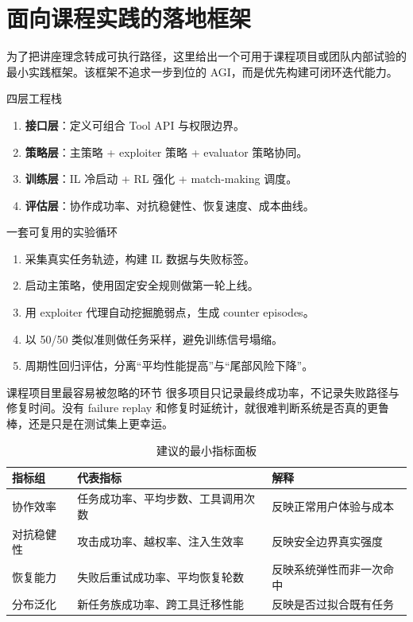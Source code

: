 \documentclass[a4paper]{article}
\begin{document}
\section{面向课程实践的落地框架}

为了把讲座理念转成可执行路径，这里给出一个可用于课程项目或团队内部试验的最小实践框架。该框架不追求一步到位的 AGI，而是优先构建可闭环迭代能力。

\begin{importantbox}{四层工程栈}
\begin{enumerate}
    \item \textbf{接口层}：定义可组合 Tool API 与权限边界。
    \item \textbf{策略层}：主策略 + exploiter 策略 + evaluator 策略协同。
    \item \textbf{训练层}：IL 冷启动 + RL 强化 + match-making 调度。
    \item \textbf{评估层}：协作成功率、对抗稳健性、恢复速度、成本曲线。
\end{enumerate}
\end{importantbox}

\begin{knowledgebox}{一套可复用的实验循环}
\begin{enumerate}
    \item 采集真实任务轨迹，构建 IL 数据与失败标签。
    \item 启动主策略，使用固定安全规则做第一轮上线。
    \item 用 exploiter 代理自动挖掘脆弱点，生成 counter episodes。
    \item 以 50/50 类似准则做任务采样，避免训练信号塌缩。
    \item 周期性回归评估，分离``平均性能提高''与``尾部风险下降''。
\end{enumerate}
\end{knowledgebox}

\begin{warningbox}{课程项目里最容易被忽略的环节}
很多项目只记录最终成功率，不记录失败路径与修复时间。没有 failure replay 和修复时延统计，就很难判断系统是否真的更鲁棒，还是只是在测试集上更幸运。
\end{warningbox}

\begin{table}[H]
\centering
\caption{建议的最小指标面板}
\begin{tabular}{p{3.0cm}p{3.2cm}p{6.4cm}}
\toprule
指标组 & 代表指标 & 解释 \\
\midrule
协作效率 & 任务成功率、平均步数、工具调用次数 & 反映正常用户体验与成本 \\
对抗稳健性 & 攻击成功率、越权率、注入生效率 & 反映安全边界真实强度 \\
恢复能力 & 失败后重试成功率、平均恢复轮数 & 反映系统弹性而非一次命中 \\
分布泛化 & 新任务族成功率、跨工具迁移性能 & 反映是否过拟合既有任务 \\
\bottomrule
\end{tabular}
\end{table}
\end{document}
